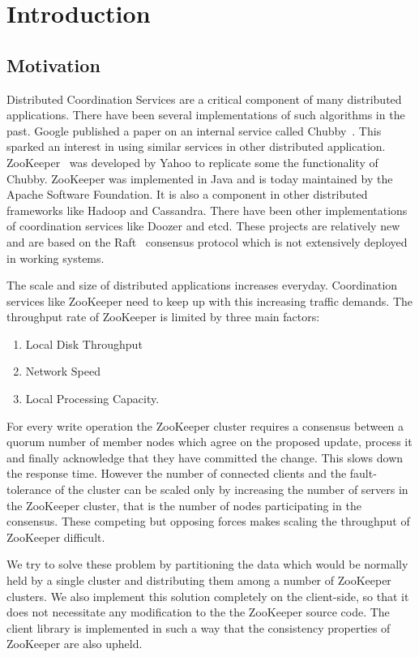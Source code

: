 \chapter{Introduction}

\section{Motivation}

Distributed Coordination Services are a critical component of many distributed applications. There have been several implementations of such algorithms in the past. Google published a paper on an internal service called Chubby~\cite{burrows2006chubby}. This sparked an interest in using similar services in other distributed application. ZooKeeper~\cite{hunt2010zookeeper} was developed by Yahoo to replicate some the functionality of Chubby. ZooKeeper was implemented in Java and is today maintained by the Apache Software Foundation. It is also a component in other distributed frameworks like Hadoop and Cassandra. There have been other implementations of coordination services like Doozer and etcd. These projects are relatively new and are based on the Raft~\cite{ongaro2013search} consensus protocol which is not extensively deployed in working systems. 

The scale and size of distributed applications increases everyday. Coordination services like ZooKeeper need to keep up with this increasing traffic demands. The throughput rate of ZooKeeper is limited by three main factors:

\begin{enumerate}
	\item Local Disk Throughput
	\item Network Speed
	\item Local Processing Capacity.
\end{enumerate}

For every write operation the ZooKeeper cluster requires a consensus between a quorum number of member nodes which agree on the proposed update, process it and finally acknowledge that they have committed the change. This slows down the response time. However the number of connected clients and the fault-tolerance of the cluster can be scaled only by increasing the number of servers in the ZooKeeper cluster, that is the number of nodes participating in the consensus. These competing but opposing forces makes scaling the throughput of ZooKeeper difficult. 

We try to solve these problem by partitioning the data which would be normally held by a single cluster and distributing them among a number of ZooKeeper clusters. We also implement this solution completely on the client-side, so that it does not necessitate any modification to the the ZooKeeper source code. The client library is implemented in such a way that the consistency properties of ZooKeeper are also upheld.

